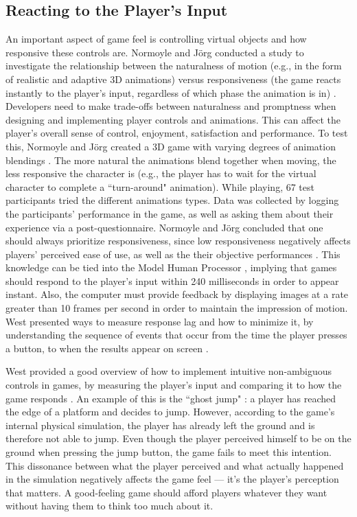 \subsection{Reacting to the Player's Input}
An important aspect of game feel is controlling virtual objects and how responsive these controls are. Normoyle and J\"{o}rg conducted a study to investigate the relationship between the naturalness of motion (e.g., in the form of realistic and adaptive 3D animations) versus responsiveness (the game reacts instantly to the player's input, regardless of which phase the animation is in) \cite{normoyle_trade-offs_2014}. Developers need to make trade-offs between naturalness and promptness when designing and implementing player controls and animations. This can affect the player's overall sense of control, enjoyment, satisfaction and performance. To test this, Normoyle and J\"{o}rg  created a 3D game with varying degrees of animation blendings \cite{normoyle_trade-offs_2014}. The more natural the animations blend together when moving, the less responsive the character is (e.g., the player has to wait for the virtual character to complete a ``turn-around" animation). While playing, 67 test participants tried the different animations types.  Data was collected by logging the participants' performance in the game, as well as asking them about their experience via a post-questionnaire. Normoyle and J\"{o}rg concluded that one should always prioritize responsiveness, since low responsiveness negatively affects players' perceived ease of use, as well as the their objective performances \cite{normoyle_trade-offs_2014}. This knowledge can be tied into the Model Human Processor \cite{card1986model}, implying that games should respond to the player's input within 240 milliseconds in order to appear instant. Also, the computer must provide feedback by displaying images at a rate greater than 10 frames per second in order to maintain the impression of motion. West presented ways to measure response lag and how to minimize it, by understanding the sequence of events that occur from the time the player presses a button, to when the results appear on screen \cite{measure_lag, program_lag}.

West provided a good overview of how to implement intuitive non-ambiguous controls in games, by measuring the player's input and comparing it to how the game responds \cite{intuitive_buttons}. An example of this is the ``ghost jump" \cite{ghostJump, canabalt}: a player has reached the edge of a platform and decides to jump. However, according to the game's internal physical simulation, the player has already left the ground and is therefore not able to jump. Even though the player perceived himself to be on the ground when pressing the jump button, the game fails to meet this intention. This dissonance between what the player perceived and what actually happened in the simulation negatively affects the game feel --- it's the player's perception that matters. A good-feeling game should afford players whatever they want without having them to think too much about it.

